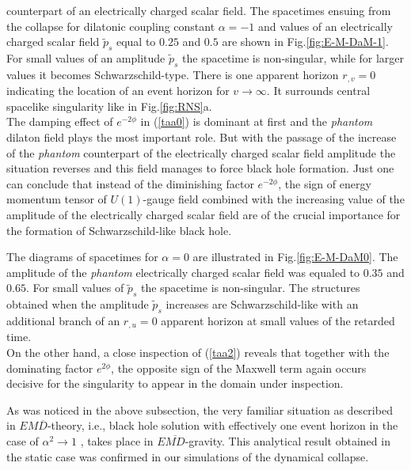 \documentclass[aps,showpacs,nofootinbib,floatfix]{revtex4}
\newcommand{\tpe}{{\tilde p}}
\begin{document}
counterpart of an electrically charged scalar field. The 
spacetimes ensuing from the collapse for dilatonic coupling constant $\alpha=-1$ and values of an electrically 
charged scalar field $\tpe_s$ equal to $0.25$ and $0.5$ are shown in Fig.\ref{fig:E-M-DaM-1}. For small values 
of an amplitude $\tpe_s$ the spacetime is non-singular, while for larger values it becomes Schwarzschild-type. 
There is one apparent horizon $r_{,v}=0$ indicating the location of an event horizon for $v\rightarrow\infty$. It 
surrounds central spacelike singularity like in Fig.\ref{fig:RNS}a.\\
The damping effect of $e^{-2 \phi}$ in (\ref{taa0}) is dominant at first and the {\it phantom} dilaton field 
plays the most important role.
But with the passage of the increase of the {\it phantom} counterpart of the electrically charged 
scalar field amplitude the situation reverses and this field manages to force black hole formation. 
Just one can conclude that instead of the diminishing factor $e^{-2 \phi}$, the sign of energy momentum 
tensor of $U(1)$-gauge field combined with the increasing
value of the amplitude of the electrically charged scalar field are of the crucial importance for the formation
of Schwarzschild-like black hole.
\par
The diagrams of spacetimes for $\alpha=0$ are illustrated in Fig.\ref{fig:E-M-DaM0}. The amplitude of the 
{\it phantom} electrically 
charged scalar field was equaled to $0.35$ and $0.65$. For small values of $\tpe_s$ the spacetime is non-singular. 
The structures obtained when the amplitude $\tpe_s$ increases 
are Schwarzschild-like with an additional branch of an $r_{,u}=0$ apparent horizon at small values of the retarded time.\\
On the other hand, a close inspection of (\ref{taa2}) reveals
that together with the dominating factor
$e^{2 \phi}$, the opposite sign of the Maxwell term
again occurs decisive for the singularity to appear in the domain under inspection.
\par
As was noticed in the above subsection, the very familiar situation as described in $E M \overline{D}$-theory,
i.e., black hole solution with effectively one event horizon in the case of $\alpha^2 \rightarrow 1$ \cite{gib96},
takes place in $E\overline{MD}$-gravity.
This analytical result obtained in the static case was confirmed in our simulations of the dynamical collapse.
\end{document}

